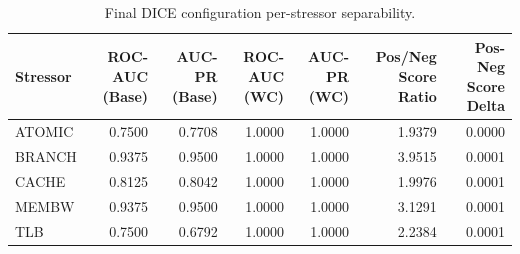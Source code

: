 \begin{table}[t]
\centering
\caption{Final DICE configuration per-stressor separability.}
\label{tab:dice_full_stressor}
\footnotesize
\begin{tabular}{lrrrrrr}
\toprule
Stressor & ROC-AUC (Base) & AUC-PR (Base) & ROC-AUC (WC) & AUC-PR (WC) & Pos/Neg Score Ratio & Pos-Neg Score Delta \\
\midrule
ATOMIC & 0.7500 & 0.7708 & 1.0000 & 1.0000 & 1.9379 & 0.0000 \\
BRANCH & 0.9375 & 0.9500 & 1.0000 & 1.0000 & 3.9515 & 0.0001 \\
CACHE & 0.8125 & 0.8042 & 1.0000 & 1.0000 & 1.9976 & 0.0001 \\
MEMBW & 0.9375 & 0.9500 & 1.0000 & 1.0000 & 3.1291 & 0.0001 \\
TLB & 0.7500 & 0.6792 & 1.0000 & 1.0000 & 2.2384 & 0.0001 \\
\bottomrule
\end{tabular}

\end{table}
